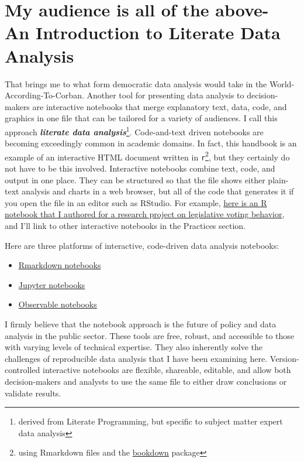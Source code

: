 \documentclass[]{book}
\providecommand{\tightlist}{%
  \setlength{\itemsep}{0pt}\setlength{\parskip}{0pt}}
\begin{document}
\hypertarget{my-audience-is-all-of-the-above--an-introduction-to-literate-data-analysis}{%
\section{My audience is all of the above- An Introduction to Literate Data Analysis}\label{my-audience-is-all-of-the-above--an-introduction-to-literate-data-analysis}}

That brings me to what form democratic data analysis would take in the World-According-To-Corban. Another tool for presenting data analysis to decision-makers are interactive notebooks that merge explanatory text, data, code, and graphics in one file that can be tailored for a variety of audiences. I call this approach \textbf{\emph{literate data analysis}}\footnote{derived from Literate Programming, but specific to subject matter expert data analysis}. Code-and-text driven notebooks are becoming exceedingly common in academic domains. In fact, this handbook is an example of an interactive HTML document written in \texttt{r}\footnote{using Rmarkdown files and the \href{bookdown.org}{bookdown} package}, but they certainly do not have to be this involved. Interactive notebooks combine text, code, and output in one place. They can be structured so that the file shows either plain-text analysis and charts in a web browser, but all of the code that generates it if you open the file in an editor such as RStudio. For example, \href{https://nemethc.com/evaluating_legislator_efficiency.nb.html\#}{here is an R notebook that I authored for a research project on legislative voting behavior}, and I'll link to other interactive notebooks in the Practices section.

Here are three platforms of interactive, code-driven data analysis notebooks:

\begin{itemize}
\tightlist
\item
  \href{https://rmarkdown.rstudio.com}{Rmarkdown notebooks}
\item
  \href{https://jupyter-notebook.readthedocs.io/en/stable/}{Jupyter notebooks}
\item
  \href{https://observablehq.com}{Observable notebooks}
\end{itemize}

I firmly believe that the notebook approach is the future of policy and data analysis in the public sector. These tools are free, robust, and accessible to those with varying levels of technical expertise. They also inherently solve the challenges of reproducible data analysis that I have been examining here. Version-controlled interactive notebooks are flexible, shareable, editable, and allow both decision-makers and analysts to use the same file to either draw conclusions or validate results.
\end{document}
